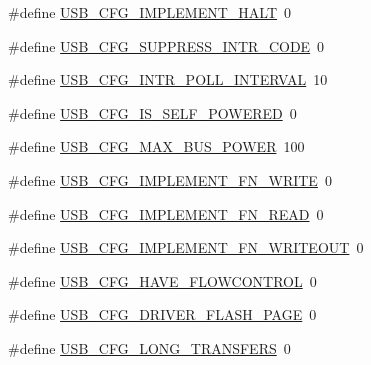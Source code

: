\begin{DoxyCompactItemize}
\item 
\#define \hyperlink{mhvlib-_vusb-_keyboard_2vusb_2usbconfig-prototype_8h_af2a9b3ecff1707f1b6554a881a87b954}{U\-S\-B\-\_\-\-C\-F\-G\-\_\-\-I\-M\-P\-L\-E\-M\-E\-N\-T\-\_\-\-H\-A\-L\-T}~0
\item 
\#define \hyperlink{mhvlib-_vusb-_keyboard_2vusb_2usbconfig-prototype_8h_a51ab4fa0f312f536ec6d4bc99a75c1b6}{U\-S\-B\-\_\-\-C\-F\-G\-\_\-\-S\-U\-P\-P\-R\-E\-S\-S\-\_\-\-I\-N\-T\-R\-\_\-\-C\-O\-D\-E}~0
\item 
\#define \hyperlink{mhvlib-_vusb-_keyboard_2vusb_2usbconfig-prototype_8h_a9cccddfefa62f926a0d7bba9f183a4d3}{U\-S\-B\-\_\-\-C\-F\-G\-\_\-\-I\-N\-T\-R\-\_\-\-P\-O\-L\-L\-\_\-\-I\-N\-T\-E\-R\-V\-A\-L}~10
\item 
\#define \hyperlink{mhvlib-_vusb-_keyboard_2vusb_2usbconfig-prototype_8h_ad5fd70b5fabd8abd34d5b9ef7100b709}{U\-S\-B\-\_\-\-C\-F\-G\-\_\-\-I\-S\-\_\-\-S\-E\-L\-F\-\_\-\-P\-O\-W\-E\-R\-E\-D}~0
\item 
\#define \hyperlink{mhvlib-_vusb-_keyboard_2vusb_2usbconfig-prototype_8h_abe324d9b00dc186bcbac65ed0f94811c}{U\-S\-B\-\_\-\-C\-F\-G\-\_\-\-M\-A\-X\-\_\-\-B\-U\-S\-\_\-\-P\-O\-W\-E\-R}~100
\item 
\#define \hyperlink{mhvlib-_vusb-_keyboard_2vusb_2usbconfig-prototype_8h_a7f117e204e14ff1028ada59f622173f2}{U\-S\-B\-\_\-\-C\-F\-G\-\_\-\-I\-M\-P\-L\-E\-M\-E\-N\-T\-\_\-\-F\-N\-\_\-\-W\-R\-I\-T\-E}~0
\item 
\#define \hyperlink{mhvlib-_vusb-_keyboard_2vusb_2usbconfig-prototype_8h_a6be8d20f2d0eb0e87460b26681e60611}{U\-S\-B\-\_\-\-C\-F\-G\-\_\-\-I\-M\-P\-L\-E\-M\-E\-N\-T\-\_\-\-F\-N\-\_\-\-R\-E\-A\-D}~0
\item 
\#define \hyperlink{mhvlib-_vusb-_keyboard_2vusb_2usbconfig-prototype_8h_afebecafb2986c559a5d346d601be9de3}{U\-S\-B\-\_\-\-C\-F\-G\-\_\-\-I\-M\-P\-L\-E\-M\-E\-N\-T\-\_\-\-F\-N\-\_\-\-W\-R\-I\-T\-E\-O\-U\-T}~0
\item 
\#define \hyperlink{mhvlib-_vusb-_keyboard_2vusb_2usbconfig-prototype_8h_a5495a12e572cdaa8e11358f92d1b324f}{U\-S\-B\-\_\-\-C\-F\-G\-\_\-\-H\-A\-V\-E\-\_\-\-F\-L\-O\-W\-C\-O\-N\-T\-R\-O\-L}~0
\item 
\#define \hyperlink{mhvlib-_vusb-_keyboard_2vusb_2usbconfig-prototype_8h_ac0335c6066303683807fc117e336e7c4}{U\-S\-B\-\_\-\-C\-F\-G\-\_\-\-D\-R\-I\-V\-E\-R\-\_\-\-F\-L\-A\-S\-H\-\_\-\-P\-A\-G\-E}~0
\item 
\#define \hyperlink{mhvlib-_vusb-_keyboard_2vusb_2usbconfig-prototype_8h_a7a4d92baced8a64f4c150b9b59d20844}{U\-S\-B\-\_\-\-C\-F\-G\-\_\-\-L\-O\-N\-G\-\_\-\-T\-R\-A\-N\-S\-F\-E\-R\-S}~0

\end{DoxyCompactItemize}
